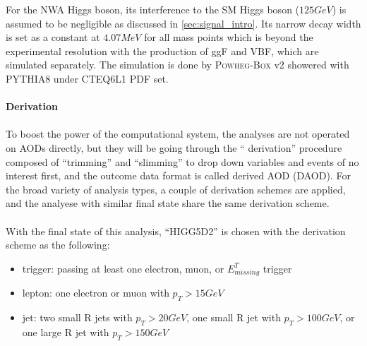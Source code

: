 \noindent
For the NWA Higgs boson, its interference to the SM Higgs boson ($125GeV$) is assumed to be negligible as discussed in \ref{sec:signal_intro}. Its narrow decay width is set as a constant at $4.07MeV$ for all mass points which is beyond the experimental resolution with the production of ggF and VBF, which are simulated separately. The simulation is done by \textsc{Powheg-Box} v2 showered with \textsc{PYTHIA8} under \textsc{CTEQ6L1} PDF set. 
\\
\\{\bf Derivation}
\\
\\To boost the power of the computational system, the analyses are not operated on AODs directly, but they will be going through the `` derivation'' procedure composed of ``trimming'' and ``slimming'' to drop down variables and events of no interest first, and the outcome data format is called derived AOD (DAOD). For the broad variety of analysis types, a couple of derivation schemes are applied, and the analyese with similar final state share the same derivation scheme. 
\\
\\With the final state of this analysis, ``HIGG5D2'' is chosen with the derivation scheme as the following:
\begin{itemize}
  \item trigger: passing at least one electron, muon, or $E^{T}_{missing}$ trigger
  \item lepton: one electron or muon with $p_{T}>15GeV$ 
  \item jet: two small R jets with $p_{T}>20GeV$, one  small R jet with $p_{T}>100GeV$, or one large R jet with $p_{T}>150GeV$
\end{itemize}
